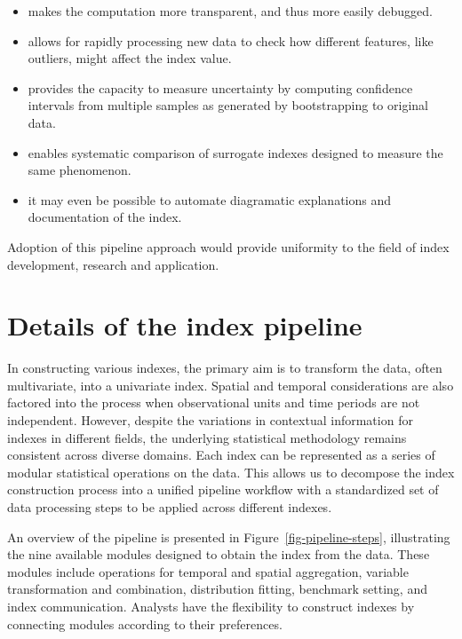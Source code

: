 \documentclass[
]{interact}
\providecommand{\tightlist}{%
  \setlength{\itemsep}{0pt}\setlength{\parskip}{0pt}}\usepackage{longtable,booktabs,array}
\begin{document}
\begin{itemize}
\tightlist
\item
  makes the computation more transparent, and thus more easily debugged.
\item
  allows for rapidly processing new data to check how different
  features, like outliers, might affect the index value.
\item
  provides the capacity to measure uncertainty by computing confidence
  intervals from multiple samples as generated by bootstrapping to
  original data.
\item
  enables systematic comparison of surrogate indexes designed to measure
  the same phenomenon.
\item
  it may even be possible to automate diagramatic explanations and
  documentation of the index.
\end{itemize}

Adoption of this pipeline approach would provide uniformity to the field
of index development, research and application.

\hypertarget{sec-index-pipeline}{%
\section{Details of the index pipeline}\label{sec-index-pipeline}}

In constructing various indexes, the primary aim is to transform the
data, often multivariate, into a univariate index. Spatial and temporal
considerations are also factored into the process when observational
units and time periods are not independent. However, despite the
variations in contextual information for indexes in different fields,
the underlying statistical methodology remains consistent across diverse
domains. Each index can be represented as a series of modular
statistical operations on the data. This allows us to decompose the
index construction process into a unified pipeline workflow with a
standardized set of data processing steps to be applied across different
indexes.

An overview of the pipeline is presented in
Figure~\ref{fig-pipeline-steps}, illustrating the nine available modules
designed to obtain the index from the data. These modules include
operations for temporal and spatial aggregation, variable transformation
and combination, distribution fitting, benchmark setting, and index
communication. Analysts have the flexibility to construct indexes by
connecting modules according to their preferences.
\end{document}
